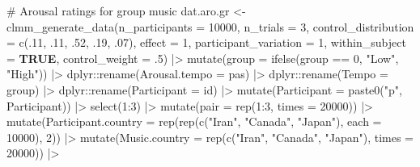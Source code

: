 \documentclass[
  bookmarksnumbered]{article}
\newenvironment{Shaded}{\begin{snugshade}}{\end{snugshade}}
\newcommand{\AttributeTok}[1]{\textcolor[rgb]{0.80,0.80,0.80}{#1}}
\newcommand{\CommentTok}[1]{\textcolor[rgb]{0.50,0.62,0.50}{#1}}
\newcommand{\ConstantTok}[1]{\textcolor[rgb]{0.86,0.64,0.64}{\textbf{#1}}}
\newcommand{\DecValTok}[1]{\textcolor[rgb]{0.86,0.86,0.80}{#1}}
\newcommand{\FunctionTok}[1]{\textcolor[rgb]{0.94,0.94,0.56}{#1}}
\newcommand{\NormalTok}[1]{\textcolor[rgb]{0.80,0.80,0.80}{#1}}
\newcommand{\OtherTok}[1]{\textcolor[rgb]{0.94,0.94,0.56}{#1}}
\newcommand{\SpecialCharTok}[1]{\textcolor[rgb]{0.86,0.64,0.64}{#1}}
\newcommand{\StringTok}[1]{\textcolor[rgb]{0.80,0.58,0.58}{#1}}
\begin{document}
\begin{Shaded}
\begin{Highlighting}[]
\CommentTok{\# Arousal ratings for group music}
\NormalTok{dat.aro.gr }\OtherTok{\textless{}{-}} \FunctionTok{clmm\_generate\_data}\NormalTok{(}\AttributeTok{n\_participants =} \DecValTok{10000}\NormalTok{,}
                                 \AttributeTok{n\_trials =} \DecValTok{3}\NormalTok{,}
                                 \AttributeTok{control\_distribution =} \FunctionTok{c}\NormalTok{(.}\DecValTok{11}\NormalTok{, .}\DecValTok{11}\NormalTok{, .}\DecValTok{52}\NormalTok{, .}\DecValTok{19}\NormalTok{, .}\DecValTok{07}\NormalTok{),}
                                 \AttributeTok{effect =} \DecValTok{1}\NormalTok{,}
                                 \AttributeTok{participant\_variation =} \DecValTok{1}\NormalTok{,}
                                 \AttributeTok{within\_subject =} \ConstantTok{TRUE}\NormalTok{,}
                                 \AttributeTok{control\_weight =}\NormalTok{ .}\DecValTok{5}\NormalTok{) }\SpecialCharTok{|\textgreater{}}
  \FunctionTok{mutate}\NormalTok{(}\AttributeTok{group =} \FunctionTok{ifelse}\NormalTok{(group }\SpecialCharTok{==} \DecValTok{0}\NormalTok{, }\StringTok{"Low"}\NormalTok{, }\StringTok{"High"}\NormalTok{)) }\SpecialCharTok{|\textgreater{}}
\NormalTok{  dplyr}\SpecialCharTok{::}\FunctionTok{rename}\NormalTok{(}\AttributeTok{Arousal.tempo =}\NormalTok{ pas) }\SpecialCharTok{|\textgreater{}}
\NormalTok{  dplyr}\SpecialCharTok{::}\FunctionTok{rename}\NormalTok{(}\AttributeTok{Tempo =}\NormalTok{ group) }\SpecialCharTok{|\textgreater{}}
\NormalTok{  dplyr}\SpecialCharTok{::}\FunctionTok{rename}\NormalTok{(}\AttributeTok{Participant =}\NormalTok{ id) }\SpecialCharTok{|\textgreater{}}
  \FunctionTok{mutate}\NormalTok{(}\AttributeTok{Participant =} \FunctionTok{paste0}\NormalTok{(}\StringTok{"p"}\NormalTok{, Participant)) }\SpecialCharTok{|\textgreater{}}
  \FunctionTok{select}\NormalTok{(}\DecValTok{1}\SpecialCharTok{:}\DecValTok{3}\NormalTok{) }\SpecialCharTok{|\textgreater{}}
  \FunctionTok{mutate}\NormalTok{(}\AttributeTok{pair =} \FunctionTok{rep}\NormalTok{(}\DecValTok{1}\SpecialCharTok{:}\DecValTok{3}\NormalTok{, }\AttributeTok{times =} \DecValTok{20000}\NormalTok{)) }\SpecialCharTok{|\textgreater{}}
  \FunctionTok{mutate}\NormalTok{(}\AttributeTok{Participant.country =} \FunctionTok{rep}\NormalTok{(}\FunctionTok{rep}\NormalTok{(}\FunctionTok{c}\NormalTok{(}\StringTok{"Iran"}\NormalTok{, }\StringTok{"Canada"}\NormalTok{, }\StringTok{"Japan"}\NormalTok{), }\AttributeTok{each =} \DecValTok{10000}\NormalTok{), }\DecValTok{2}\NormalTok{)) }\SpecialCharTok{|\textgreater{}}
  \FunctionTok{mutate}\NormalTok{(}\AttributeTok{Music.country =} \FunctionTok{rep}\NormalTok{(}\FunctionTok{c}\NormalTok{(}\StringTok{"Iran"}\NormalTok{, }\StringTok{"Canada"}\NormalTok{, }\StringTok{"Japan"}\NormalTok{), }\AttributeTok{times =} \DecValTok{20000}\NormalTok{)) }\SpecialCharTok{|\textgreater{}}

\end{Highlighting}
\end{Shaded}
\end{document}
